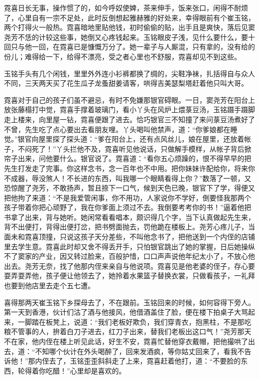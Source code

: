 \par 霓喜日长无事，操作惯了的，如今呼奴使婢，茶来伸手，饭来张口，闲得不耐烦了，心里自有一宗不足处，此时反倒想起雅赫雅的好处来，幸得眼前有个崔玉铭，两个打得火一般热。霓喜暗地里贴他钱，初时偷偷的贴，出手且是爽快，落后见窦尧芳不恁的计较这些事，她倒又心疼钱起来。玉铭眼皮子浅，见什么要什么，要十回只与他一回，在霓喜已是慷慨万分了。她一辈子与人厮混，只有拿的，没有给的份儿；难得给一下，给得不漂亮，受之者心里也不舒服，霓喜却见不到这些。
\par 玉铭手头有几个闲钱，里里外外连小衫裤都换了绸的，尖鞋净袜，扎括得自与众人不同，三天两天买了花生瓜子龙蚤甜姜请客，哄得吉美瑟梨塔赶着他只叫大哥。
\par 霓喜对于自己的孩子们虽不避忌，有时不免嫌那银官碍眼。一日，窦尧芳在阳台上放张藤榻打中觉，霓喜手撑着玻璃门，看小丫头在风炉上煨菉豆汤，玉铭蹑手蹑脚走上楼来，向里屋一钻，霓喜便跟了进去。恰巧银官三不知撞了来问菉豆汤煮好了不曾，先生吃了点心要出去看朋友哩。丫头喝叫他禁声，道：“你爹娘都在睡觉。”银官向屋里探了探头道：“爹在阳台上，还有点风丝儿，娘在屋里，还放着帐子，不闷死了！”丫头拦他不及，霓喜听见他说话，只做解手模样，从帐子背后掀帘子出来，问他要什么。银官说了。霓喜道：“看你五心烦躁的，恨不得早早的把先生打发走了完事。你这样念书，念一百年也不中用。把你妹妹许配给你，将来你不成器，辱没煞人！不长进的东西，叫我哪一个眼睛看得上你？”数落了一顿，又恐惊醒了尧芳，不敢扬声，暂且捺下一口气，候到天色已晚，银官下了学，得便又把他拘了来道：“不是我爱管闲事，你不用功，人家说你不学好，倒要怪我那两个孩子带着你把心顽野了，我在你爹面上须过不去。我倒要考考你的书！”逼着他把书拿了出来，背与她听。她闲常看看唱本，颇识得几个字，当下认真做起先生来，背不出便打，背得出便打岔，把书劈面抛去，罚他跪在楼板上。尧芳心疼儿子，当面未和霓喜顶撞，只说这孩子天分差些，不叫他念书了，把他送到一个内侄的店铺里去学生意。霓喜此时却又舍不得丢开手，只怕银官跳出了她的掌握，日后她操纵不了窦家的产业，因又转过脸来，百般护惜，口口声声说他年纪太小了，不放心他出去。尧芳无奈，找了他那内侄来亲自与他说项。霓喜见是他老婆的侄子，存心要耍弄耍弄他，孩子便让他领去了，她拎着水果篮子替换衣裳，只做看孩子，一礼拜也要到他店里去走个五七遭。
\par 喜得那两天崔玉铭下乡探母去了，不在跟前。玉铭回来的时候，如何容得下旁人。第一天到香港，伙计们沽了酒与他接风，他借酒盖住了脸，便在楼下拍桌子大骂起来，一脚踏在板凳上，说道：“我们老板好欺负，我们穿青衣，抱黑柱，不是那吃粮不管事的人，拚着白刀子进去，红刀子出来，替我们老板出这口气！”尧芳那天不在家，他内侄在楼上听见此话，好生不安，霓喜忙替他穿衣戴帽，把他撮哄了出去，道：“不知哪个伙计在外头喝醉了，回来发酒疯，等你姑丈回来了，看我不告诉他！”那内侄去了，玉铭歪歪斜斜走了上来，霓喜赶着他打，道：“不要脸的东西，轮得着你吃醋！”心里却是喜欢的。
